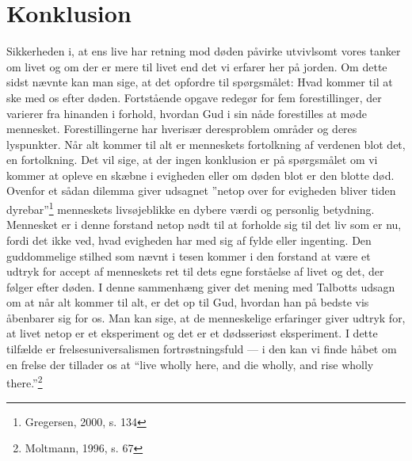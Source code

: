 \chapter{Konklusion}
Sikkerheden i, at ens live har retning mod døden påvirke utvivlsomt vores tanker om livet og om der er mere til livet end det vi erfarer her på jorden. Om dette sidst nævnte kan man sige, at det opfordre til spørgsmålet: Hvad kommer til at ske med os efter døden. Fortstående opgave redegør for fem forestillinger, der varierer fra hinanden i forhold, hvordan Gud i sin nåde forestilles at møde mennesket. Forestillingerne har hverisær deresproblem områder og deres lyspunkter. Når alt kommer til alt er menneskets fortolkning af verdenen blot det, en fortolkning. Det vil sige, at der ingen konklusion er på spørgsmålet om vi kommer at opleve en skæbne i evigheden eller om døden blot er den blotte død. Ovenfor et sådan dilemma giver udsagnet ”netop over for evigheden bliver tiden dyrebar”\footnote{Gregersen, 2000, s. 134} menneskets livsøjeblikke en dybere værdi og personlig betydning. Mennesket er i denne forstand netop nødt til at forholde sig til det liv som er nu, fordi det ikke ved, hvad evigheden har med sig af fylde eller ingenting. Den guddommelige stilhed som nævnt i tesen kommer i den forstand at være et udtryk for accept af menneskets ret til dets egne forståelse af livet og det, der følger efter døden. I denne sammenhæng giver det mening med Talbotts udsagn om at når alt kommer til alt, er det op til Gud, hvordan han på bedste vis åbenbarer sig for os. 
Man kan sige, at de menneskelige erfaringer giver udtryk for, at livet netop er et eksperiment og det er et dødsseriøst eksperiment. I dette tilfælde er frelsesuniversalismen fortrøstningsfuld — i den kan vi finde håbet om en frelse der tillader os at “live wholly here, and die wholly, and rise wholly there.”\footnote{Moltmann, 1996, s. 67}  